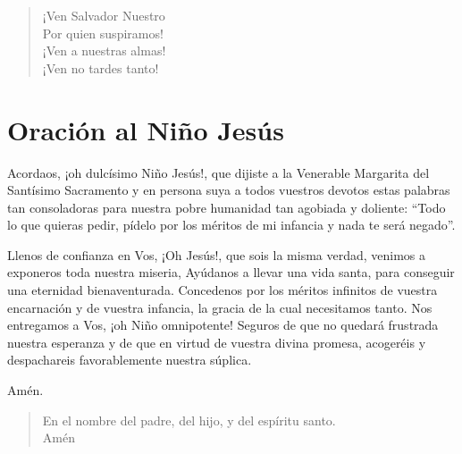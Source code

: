 \documentclass[spanish,utf8,12pt,twocolumn]{chlart}
\newenvironment{lectura}{\begingroup\color{lector}}{\endgroup\par}
\newenvironment{gozo}{\begin{verse}\color{lector}}{\end{verse}}
\newcommand*\vena{{\color{responden}\hspace{1em}¡Ven a nuestras almas!\\\hspace{1em}¡Ven no tardes tanto!}}
\begin{document}
\begin{gozo}
¡Ven Salvador Nuestro\\
Por quien suspiramos!\\
\vena
\end{gozo}

\section{Oración al Niño Jesús}
\begin{lectura}
Acordaos, ¡oh dulcísimo Niño Jesús!, que dijiste a la Venerable
Margarita del Santísimo Sacramento y en persona suya a todos vuestros
devotos estas palabras tan consoladoras para nuestra pobre humanidad tan
agobiada y doliente:
“Todo lo que quieras pedir, pídelo por los méritos de mi infancia y nada
te será negado”.

Llenos de confianza en Vos, ¡Oh Jesús!, que sois la misma verdad,
venimos a exponeros toda nuestra miseria, Ayúdanos a llevar una vida
santa, para conseguir una eternidad bienaventurada.
Concedenos por los méritos infinitos de vuestra encarnación y de vuestra
infancia, la gracia de la cual necesitamos tanto.
Nos entregamos a Vos, ¡oh Niño omnipotente!
Seguros de que no quedará frustrada nuestra esperanza y de que en virtud
de vuestra divina promesa, acogeréis y despachareis favorablemente
nuestra súplica.

Amén.
\end{lectura}

\begin{gozo}
En el nombre del padre, del hijo, y del espíritu santo.\\Amén
\end{gozo}
\end{document}
